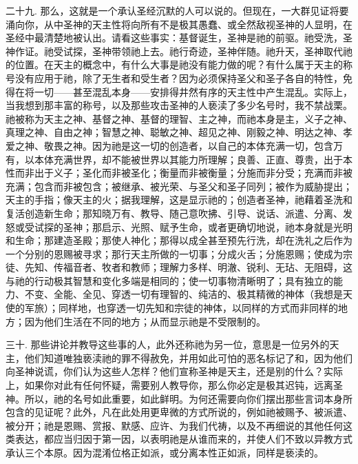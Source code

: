 二十九. 那么，这就是一个承认圣经沉默的人可以说的。但现在，一大群见证将要涌向你，从中圣神的天主性将向所有不是极其愚蠢、或全然敌视圣神的人显明，在圣经中最清楚地被认出。请看这些事实：基督诞生，圣神是祂的前驱。祂受洗，圣神作证。祂受试探，圣神带领祂上去。祂行奇迹，圣神伴随。祂升天，圣神取代祂的位置。在天主的概念中，有什么大事是祂没有能力做的呢？有什么属于天主的称号没有应用于祂，除了无生者和受生者？因为必须保持圣父和圣子各自的特性，免得在将一切——甚至混乱本身——安排得井然有序的天主性中产生混乱。实际上，当我想到那丰富的称号，以及那些攻击圣神的人亵渎了多少名号时，我不禁战栗。祂被称为天主之神、基督之神、基督的理智、主之神，而祂本身是主，义子之神、真理之神、自由之神；智慧之神、聪敏之神、超见之神、刚毅之神、明达之神、孝爱之神、敬畏之神。因为祂是这一切的创造者，以自己的本体充满一切，包含万有，以本体充满世界，却不能被世界以其能力所理解；良善、正直、尊贵，出于本性而非出于义子；圣化而非被圣化；衡量而非被衡量；分施而非分受；充满而非被充满；包含而非被包含；被继承、被光荣、与圣父和圣子同列；被作为威胁提出；天主的手指；像天主的火；据我理解，这是显示祂的；创造者圣神，祂藉着圣洗和复活创造新生命；那知晓万有、教导、随己意吹拂、引导、说话、派遣、分离、发怒或受试探的圣神；那启示、光照、赋予生命，或者更确切地说，祂本身就是光明和生命；那建造圣殿；那使人神化；那得以成全甚至预先行洗，却在洗礼之后作为一个分别的恩赐被寻求；那行天主所做的一切事；分成火舌；分施恩赐；使成为宗徒、先知、传福音者、牧者和教师；理解力多样、明澈、锐利、无玷、无阻碍，这与祂的行动极其智慧和变化多端是相同的；使一切事物清晰明了；具有独立的能力、不变、全能、全见、穿透一切有理智的、纯洁的、极其精微的神体（我想是天使的军旅）；同样地，也穿透一切先知和宗徒的神体，以同样的方式而非同样的地方；因为他们生活在不同的地方；从而显示祂是不受限制的。\par

三十. 那些讲论并教导这些事的人，此外还称祂为另一位，意思是一位另外的天主，他们知道唯独亵渎祂的罪不得赦免，并用如此可怕的恶名标记了和，因为他们向圣神说谎，你们认为这些人怎样？他们宣称圣神是天主，还是别的什么？实际上，如果你对此有任何怀疑，需要别人教导你，那么你必定是极其迟钝，远离圣神。所以，祂的名号如此重要，如此鲜明。为何还需要向你们摆出那些言词本身所包含的见证呢？此外，凡在此处用更卑微的方式所说的，例如祂被赐予、被派遣、被分开；祂是恩赐、赏报、默感、应许、为我们代祷，以及不再细说的其他任何这类表达，都应当归因于第一因，以表明祂是从谁而来的，并使人们不致以异教方式承认三个本原。因为混淆位格正如派，或分离本性正如派，同样是亵渎的。\par

